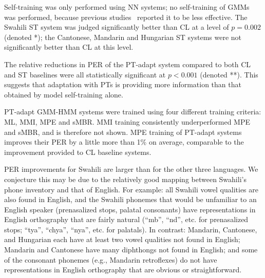 Self-training was only performed
using NN systems; no self-training of GMMs was performed, because
previous studies~\cite{Huang2013} reported it to be less effective.
The Swahili {\sc ST} system was judged significantly better
than {\sc CL} at a level of $p=0.002$ (denoted *); the Cantonese,
Mandarin and
Hungarian {\sc ST} systems were not significantly better
than {\sc CL} at this level.

The relative reductions in PER
of the {\sc PT-adapt} system
compared to both {\sc CL} and {\sc ST} baselines
were all statistically
significant at $p<0.001$ (denoted **).  This suggests that adaptation
with PTs is providing more information than that obtained by model
self-training alone.

PT-adapt GMM-HMM systems were trained using four
different training criteria: ML, MMI, MPE and sMBR.  MMI training
consistently underperformed MPE and sMBR, and is therefore not shown.
MPE training of {\sc PT-adapt} systems improves their PER by a little
more than 1\% on average, comparable to the improvement provided
to {\sc CL} baseline systems.

PER improvements for Swahili are larger than for the other three
languages.
We conjecture this may be due to the relatively good mapping between
Swahili's phone inventory and that of English. For example: all Swahili
vowel qualities are also found in English, and the Swahili phonemes 
that would be unfamiliar to an English speaker (prenasalized stops, 
palatal consonants) have representations in English orthography that are 
fairly natural (``mb'', ``nd'', etc. for prenasalized stops; ``tya'', 
``chya'', ``nya'', etc. for palatals). In contrast: Mandarin, 
Cantonese, and Hungarian each have at least two vowel qualities not 
found in English; Mandarin and 
Cantonese have many diphthongs not found in English; and some of the 
consonant phonemes (e.g., Mandarin retroflexes) do not have 
representations in English orthography that are obvious or 
straightforward.
